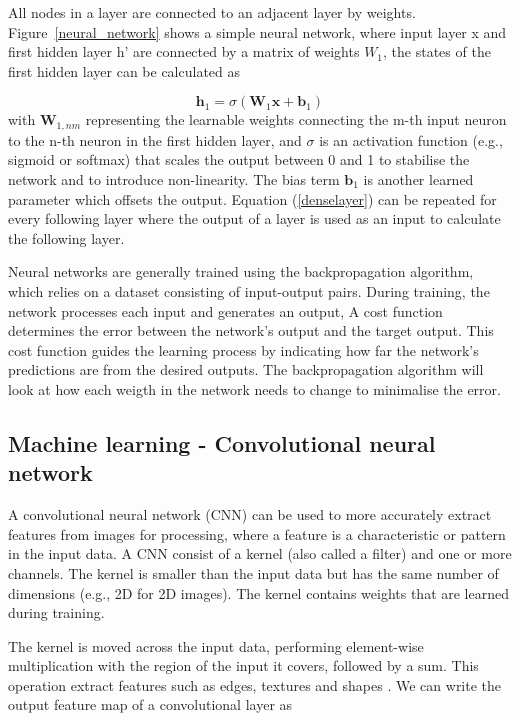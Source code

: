\documentclass{article}
\begin{document}
All nodes in a layer are connected to an adjacent layer by weights. Figure~\ref{neural_network} shows a simple neural network, where input layer x and first hidden layer h' are connected by a matrix of weights $W_1$, the states of the first hidden layer can be calculated as

\begin{equation}
\label{denseLayer}
\mathbf{h}_1 = \sigma(\mathbf{W}_1 \mathbf{x} + \mathbf{b}_1)
\end{equation}
with $\mathbf{W}_{1,nm}$ representing the learnable weights connecting the m-th input neuron to the n-th neuron in the first hidden layer, and $\sigma$ is an activation function (e.g., sigmoid or softmax) that scales the output between 0 and 1 to stabilise the network and to introduce non-linearity. The bias term $\mathbf{b}_1$ is another learned parameter which offsets the output. Equation (\ref{denselayer}) can be repeated for every following layer where the output of a layer is used as an input to calculate the following layer.

Neural networks are generally trained using the backpropagation algorithm, which relies on a dataset consisting of input-output pairs. During training, the network processes each input and generates an output, A cost function determines the error between the network's output and the target output. This cost function guides the learning process by indicating how far the network's predictions are from the desired outputs. The backpropagation algorithm will look at how each weigth in the network needs to change to minimalise the error.

\subsection{Machine learning - Convolutional neural network}

A convolutional neural network (CNN) can be used to more accurately extract features from images for processing, where a feature is a characteristic or pattern in the input data. A CNN consist of a kernel (also called a filter) and one or more channels. The kernel is smaller than the input data but has the same number of dimensions (e.g., 2D for 2D images). The kernel contains weights that are learned during training.

The kernel is moved across the input data, performing element-wise multiplication with the region of the input it covers, followed by a sum. This operation extract features such as edges, textures and shapes \citep{yamashita2018convolutional}. We can write the output feature map of a convolutional layer as
\end{document}
